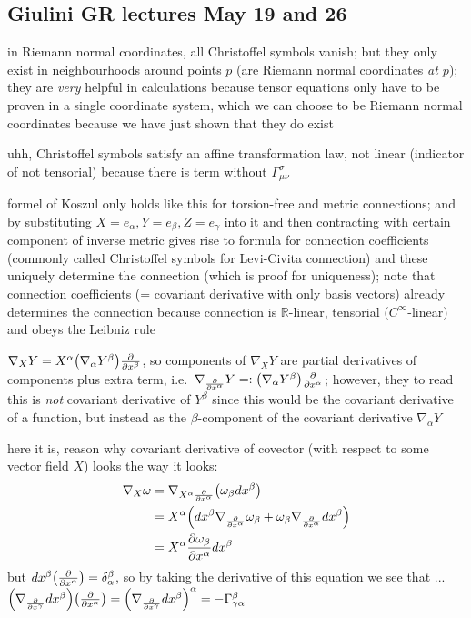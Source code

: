 \documentclass[ART_main.tex]{subfiles}
\begin{document}
\subsection{Giulini GR lectures May 19 and 26}
in Riemann normal coordinates, all Christoffel symbols vanish; but they only exist in neighbourhoods around points $p$ (are Riemann normal coordinates \emph{at $p$}); they are \emph{very} helpful in calculations because tensor equations only have to be proven in a single coordinate system, which we can choose to be Riemann normal coordinates because we have just shown that they do exist

uhh, Christoffel symbols satisfy an affine transformation law, not linear (indicator of not tensorial) because there is term without $\Gamma_{\mu \nu}^\sigma$


formel of Koszul only holds like this for torsion-free and metric connections; and by substituting $X = e_\alpha, Y = e_\beta, Z = e_\gamma$ into it and then contracting with certain component of inverse metric gives rise to formula for connection coefficients (commonly called Christoffel symbols for Levi-Civita connection) and these uniquely determine the connection (which is proof for uniqueness); note that connection coefficients (= covariant derivative with only basis vectors) already determines the connection because connection is $\mathbb{R}$-linear, tensorial ($C^\infty$-linear) and obeys the Leibniz rule

$\nabla_X Y = X^\alpha \qty(\nabla_\alpha Y^\beta) \pdv{x^\beta}$, so components of $\nabla_X Y$ are partial derivatives of components plus extra term, i.e.~$\nabla_{\pdv{x^\alpha}} Y =: \qty(\nabla_\alpha Y^\beta) \pdv{x^\alpha}$; however, they to read this is \emph{not} covariant derivative of $Y^\beta$ since this would be the covariant derivative of a function, but instead as the $\beta$-component of the covariant derivative $\nabla_\alpha Y$


here it is, reason why covariant derivative of covector (with respect to some vector field $X$) looks the way it looks:
\begin{align*}
\nabla_X \omega &= \nabla_{X^\alpha \pdv{x^\alpha}} \qty(\omega_\beta dx^\beta)
\\
&= X^\alpha \qty(dx^\beta \nabla_{\pdv{x^\alpha}} \omega_\beta + \omega_\beta \nabla_{\pdv{x^\alpha}} dx^\beta)
\\
&= X^\alpha \pdv{\omega_\beta}{x^\alpha} dx^\beta
\end{align*}
but $dx^\beta\qty(\pdv{x^\alpha}) = \delta_\alpha^\beta$, so by taking the derivative of this equation we see that ... $\qty(\nabla_{\pdv{x^\gamma}} dx^\beta)\qty(\pdv{x^\alpha}) = \qty(\nabla_{\pdv{x^\gamma}} dx^\beta)^\alpha = - \Gamma_{\gamma \alpha}^\beta$
\end{document}
